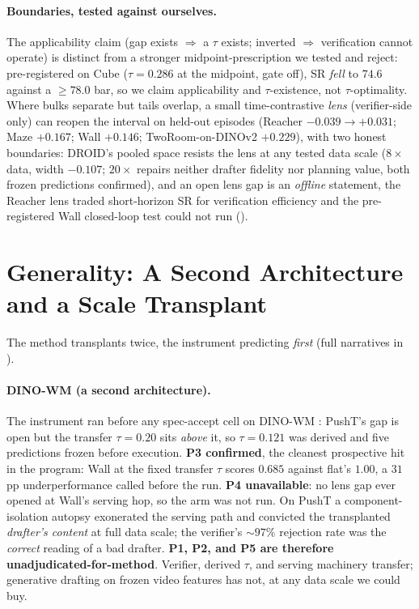 \paragraph{Boundaries, tested against ourselves.} The applicability claim
(gap exists $\Rightarrow$ a $\tau$ exists; inverted $\Rightarrow$ verification
cannot operate) is distinct from a stronger midpoint-prescription we tested
and reject: pre-registered on Cube ($\tau{=}0.286$ at the midpoint, gate off),
SR \emph{fell} to $74.6$ against a $\ge78.0$ bar, so we claim applicability
and $\tau$-existence, not $\tau$-optimality. Where bulks separate but tails
overlap, a small time-contrastive \emph{lens} (verifier-side only) can reopen
the interval on held-out episodes (Reacher $-0.039 \to +0.031$; Maze
$+0.167$; Wall $+0.146$; TwoRoom-on-DINOv2 $+0.229$), with two honest
boundaries: DROID's pooled space resists the lens at any tested data scale
($8\times$ data, width $-0.107$; $20\times$ repairs neither drafter fidelity
nor planning value, both frozen predictions confirmed), and an open lens gap
is an \emph{offline} statement, the Reacher lens traded short-horizon SR for
verification efficiency and the pre-registered Wall closed-loop test could
not run ().

\section{Generality: A Second Architecture and a Scale Transplant}
\label{sec:generality}

The method transplants twice, the instrument predicting \emph{first} (full
narratives in ).

\paragraph{DINO-WM (a second architecture).}\label{sec:generality-dinowm}
The instrument ran before any spec-accept cell on DINO-WM \citep{dinowm}:
PushT's gap is open but the transfer $\tau{=}0.20$ sits \emph{above} it, so
$\tau{=}0.121$ was derived and five predictions frozen before execution.
\textbf{P3 confirmed}, the cleanest prospective hit in the program: Wall at
the fixed transfer $\tau$ scores $0.685$ against flat's $1.00$, a $31$pp
underperformance called before the run. \textbf{P4 unavailable}: no lens gap
ever opened at Wall's serving hop, so the arm was not run. On PushT a
component-isolation autopsy exonerated the serving path and convicted the
transplanted \emph{drafter's content} at full data scale; the verifier's
${\sim}97\%$ rejection rate was the \emph{correct} reading of a bad drafter.
\textbf{P1, P2, and P5 are therefore unadjudicated-for-method}. Verifier,
derived $\tau$, and serving machinery transfer; generative drafting on frozen
video features has not, at any data scale we could buy.

